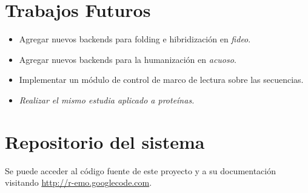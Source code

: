 \section{Trabajos Futuros}
\begin{itemize}
	\item Agregar nuevos backends para folding e hibridización en \emph{fideo}.	
	\item Agregar nuevos backends para la humanización en \emph{acuoso}.
	\item Implementar un módulo de control de marco de lectura sobre las secuencias.
	\item \emph{Realizar el mismo estudia aplicado a proteínas.}
\end{itemize}

\section{Repositorio del sistema}
Se puede acceder al código fuente de este proyecto y a su documentación visitando \url{http://r-emo.googlecode.com}.


